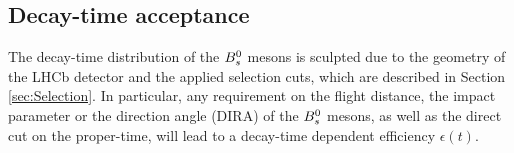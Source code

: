 \clearpage

\subsection{Decay-time acceptance}
\label{sec:timeAcceptance}
The decay-time distribution of the ${{B}^0_{s}}$ mesons is sculpted due to the geometry of the LHCb detector and the applied selection cuts, which are described in Section \ref{sec:Selection}.
In particular, any requirement on the flight distance, the impact parameter or the direction angle (DIRA) of the ${{B}^0_{s}}$ mesons, as well as the direct cut on the proper-time, will lead to a decay-time dependent efficiency $\epsilon(t)$. 

